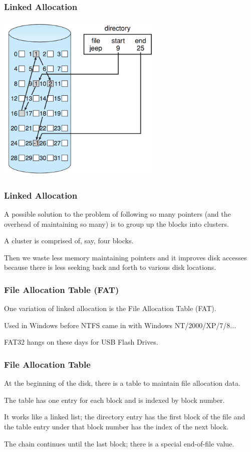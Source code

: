 \begin{frame}
\frametitle{Linked Allocation}

\begin{center}
	\includegraphics[width=0.6\textwidth]{images/disk-linked.png}
\end{center}

\end{frame}

\begin{frame}
\frametitle{Linked Allocation}

A possible solution to the problem of following so many pointers (and the overhead of maintaining so many) is to group up the blocks into \alert{clusters}.

A cluster is comprised of, say, four blocks. 

Then we waste less memory maintaining pointers and it improves disk accesses because there is less seeking back and forth to various disk locations.

\end{frame}

\begin{frame}
\frametitle{File Allocation Table (FAT)}

One variation of linked allocation is the File Allocation Table (FAT).

Used in Windows before NTFS came in with Windows NT/2000/XP/7/8...

FAT32 hangs on these days for USB Flash Drives.

\end{frame}

\begin{frame}
\frametitle{File Allocation Table}


At the beginning of the disk, there is a table to maintain file allocation data. 

The table has one entry for each block and is indexed by block number. 

It works like a linked list; the directory entry has the first block of the file and the table entry under that block number has the index of the next block. 

The chain continues until the last block; there is a special end-of-file value. 

\end{frame}

